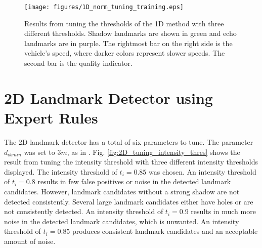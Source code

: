 \begin{figure}  %
  \centering
  \texttt{[image: figures/1D\_norm\_tuning\_training.eps]}
  \caption[Results of tuning threshold of the 1D method]{Results from tuning the thresholds of the 1D method with three different thresholds. Shadow landmarks are shown in green and echo landmarks are in purple. The rightmost bar on the right side is the vehicle's speed, where darker colors represent slower speeds. The second bar is the quality indicator.}
  \label{fig:1D_norm_tuning_training}
\end{figure}



\section{2D Landmark Detector using Expert Rules}

The 2D landmark detector has a total of six parameters to tune. The parameter $d_{ob min}$ was set to $3 m $, as in \cite{Leblond2019SonarProject}. Fig. \ref{fig:2D_tuning_intensity_thres} shows the result from tuning the intensity threshold with three different intensity thresholds displayed. The intensity threshold of $t_i = 0.85$ was chosen. An intensity threshold of $t_i = 0.8$ results in few false positives or noise in the detected landmark candidates. However, landmark candidates without a strong shadow are not detected consistently. Several large landmark candidates either have holes or are not consistently detected. An intensity threshold of $t_i = 0.9$ results in much more noise in the detected landmark candidates, which is unwanted. An intensity threshold of $t_i = 0.85$ produces consistent landmark candidates and an acceptable amount of noise. 

